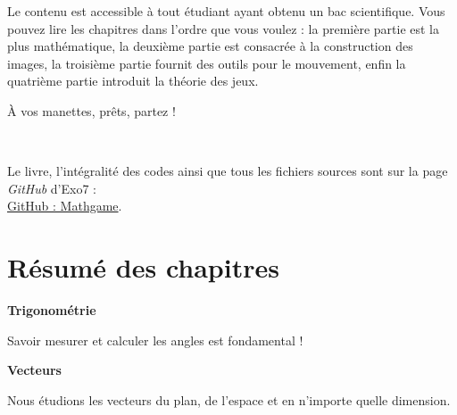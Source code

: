 \medskip

Le contenu est accessible à tout étudiant ayant obtenu un bac scientifique. Vous pouvez lire les chapitres dans l'ordre que vous voulez : la première partie est la plus mathématique, la deuxième partie est consacrée à la construction des images, la troisième partie fournit des outils pour le mouvement, enfin la quatrième partie introduit la théorie des jeux.

\medskip

À vos manettes, prêts, partez !
  

~
\bigskip
\vfill
\begin{center}
    
Le livre, l'intégralité des codes ainsi que tous les fichiers sources sont sur la page \emph{GitHub} d'Exo7 :\\
\href{https://github.com/exo7math/mathgame-exo7}{\og{}GitHub : Mathgame\fg{}}.
\end{center}
\vfill




\cleardoublepage
\thispagestyle{empty}
\tableofcontents

\cleardoublepage
\section*{Résumé des chapitres}


\newcommand{\titrechapitre}[1]{{\textbf{#1}}\nopagebreak}
\newcommand{\descriptionchapitre}[1]{%
\smallskip\hfill
\begin{minipage}{0.95\textwidth}\small#1\end{minipage}\medskip\smallskip}





\titrechapitre{Trigonométrie}

\descriptionchapitre{Savoir mesurer et calculer les angles est fondamental !}


\titrechapitre{Vecteurs}

\descriptionchapitre{Nous étudions les vecteurs du plan, de l'espace et en n'importe quelle dimension.}


